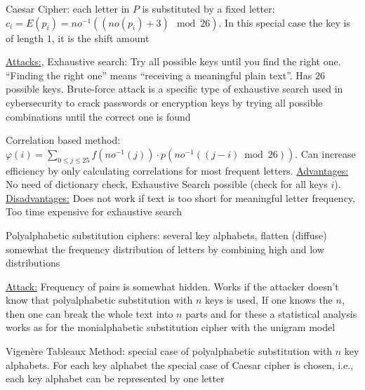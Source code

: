 \documentclass[landscape, a4paper]{article}
\begin{document}
\begin{minipage}[t]{0.2\linewidth}
\begin{betterlist}
\begin{betterlist}
\begin{betterlist}
			\end{betterlist}
			\begin{betterlist}
				\item \alert{Caesar Cipher:} each letter in $P$ is substituted by a fixed letter: $c_i = E(p_i) = no^{-1}((no(p_i) + 3) \mod 26)$. In this special case the \alert{key} is of length $1$, it is the shift amount
				\begin{betterlist}
					\item \underline{Attacks:}, \alert{Exhaustive search:} Try all possible keys until you find the right one. \enquote{Finding the right one} means \enquote{receiving a meaningful plain text}. Has $26$ possible keys. \alert{Brute-force attack} is a specific type of exhaustive search used in cybersecurity to crack passwords or encryption keys by trying all possible combinations until the correct one is found
					\item \alert{Correlation based method:} $\varphi(i)=\sum_{0 \leq j \leq 25} f\left(n o^{-1}(j)\right) \cdot p\left(n o^{-1}((j-i) \bmod 26)\right)$. Can increase efficiency by only calculating correlations for most frequent letters. \underline{Advantages:} No need of dictionary check, Exhaustive Search possible (check for all keys $i$). \underline{Disadvantages:} Does not work if text is too short for meaningful letter frequency, Too time expensive for exhaustive search
				\end{betterlist}
			\end{betterlist}
		\end{betterlist}
		\begin{betterlist}
			\item \alert{Polyalphabetic substitution ciphers:} several key alphabets, flatten (diffuse) somewhat the frequency distribution of letters by combining high and low distributions
			\begin{betterlist}
				\item \underline{Attack:} Frequency of pairs is somewhat hidden. Works if the attacker doesn't know that polyalphabetic substitution with $n$ keys is used, If one knows the $n$, then one can break the whole text into $n$ parts and for these a \alert{statistical analysis} works as for the monialphabetic substitution cipher with the unigram model
			\end{betterlist}
			\begin{betterlist}
				\item \alert{Vigenère Tableaux Method:} special case of polyalphabetic substitution with $n$ key alphabets. For each key alphabet the special case of Caesar cipher is chosen, i.e., each key alphabet can be represented by one letter%

\end{betterlist}
\end{betterlist}
\end{betterlist}
\end{minipage}
\end{document}

